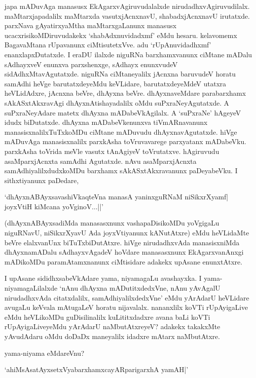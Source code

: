 japa mADuvAga manasusx EkAgarxvAgiruvudalalxde nirudadhxvAgiruvudilalx. maMtarxjapadalilx maMtarxda vasutxjAcnxnavU, shabadxjAcnxnavU irutatxde. parxNava gAyatirxyaMtha maMtarxgaLanunx manasusx ucacxrisikoMDiruvudakekx `shabAdxnuvidadxmf' eMdu hesaru. kelavomemx BagavaMtana rUpavanunx ciMtisutetxVve. adu `rUpAnuvidadhxmf' enanxlapxDutatxde. I eraDU ilalxde niguRNa barxhamxvanunx ciMtane mADalu sAdhayxveV enunxva parxshenxge, sAdhayx enunxvudeV sidAdhxMtavAgutatxde. niguRNa ciMtaneyalilx jAcnxna baruvudeV horatu samAdhi heVge barutatxdeyeMdu keVLidare, barutatxdeyeMdeV utatxra heVLidAdxre, jAcnxna beVre, dhAyxna beVre. dhAyxnaveMdare parabarxhamx sAkASxtAkxravAgi dhAyxnAtishayadalilx oMdu suPxraNeyAgutatxde. A suPxraNeyAdare matetx dhAyxna mADabeVkAgilalx. A `suPxraNe' hAgeyeV idudx biDutatxde. dhAyxna mADabeVkenunxva tiVmARnavanunx manasisxnalilxTuTxkoMDu ciMtane mADuvudu dhAyxnavAgutatxde. hiVge mADuvAga manasisxnalilx parxkAsha toVruvavarege parxyatanx mADabeVku. parxkAsha toVrida meVle vasutx tAnAgiyeV toVrutatxve. hAgiruvudu asaMparxjAcnxta samAdhi Agutatxde. nAvu asaMparxjAcnxta samAdhiyalilxdudxkoMDu barxhamx sAkASxtAkxravanunx paDeyabeVku. I sithxtiyanunx paDedare, 

\begin{shloka}
`dhAyxnABAyxsavashiVkaqteVna manasA yaninxguRNaM niSikxrXyamf|\\
joyxVtiH kiMcana yoVginoV$\ldots$||'
\end{shloka}

(dhAyxnABAyxsadiMda manasasxnunx vashapaDisikoMDu yoVgigaLu niguRNavU, niSikxrXyavU Ada joyxVtiyanunx kANutAtxre) eMdu heVLidaMte beVre elalxvanUnx biTuTxbiDutAtxre. hiVge nirudadhxvAda manasisxniMda dhAyxnamADalu sAdhayxvAgadeV hoVdare manasasxnunx EkAgarxvanAnxgi mADikoMDu paramAtamxnanunx ciMtisidare adakekx upAsane enunxtAtxre.

I upAsane sididhxsabeVkAdare yama, niyamagaLu avashayxka. I yama-niyamagaLilalxde `nAnu dhAyxna mADutitxdedxVne, nAnu yAvAgalU nirudadhxvAda citatxdalilx, samAdhiyalilxdedxVne' eMdu yArAdarU heVLidare avugaLu keVvala mAtugaLeV horatu nijavalalx. nananxlilx koVTi rUpAyigaLive eMdu heVLikoMDu guDisilinalilx kuLititxdadxre avana baLi koVTi rUpAyigaLiveyeMdu yArAdarU naMbutAtxreyeV? adakekx takakxMte yAvudAdaru oMdu doDaDx maneyalilx idadxre mAtarx naMbutAtxre.

yama-niyama eMdareVnu?

\begin{shloka}
`ahiMsAsatAyxsetxVyabarxhamxcayARparigarxhA yamAH|'
\end{shloka}


